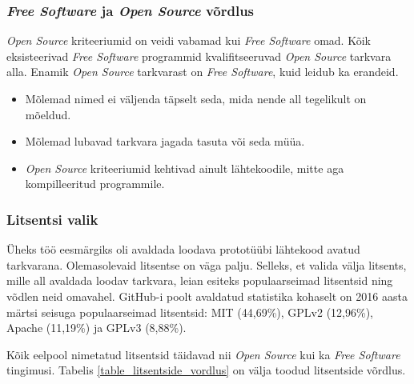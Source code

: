 \documentclass[a4paper,12pt]{article} %
\begin{document}
\subsubsection{\textit{Free Software} ja \textit{Open Source} võrdlus}
\textit{Open Source} kriteeriumid on veidi vabamad kui \textit{Free Software} omad. Kõik eksisteerivad \textit{Free Software} programmid kvalifitseeruvad \textit{Open Source} tarkvara alla. Enamik \textit{Open Source} tarkvarast on \textit{Free Software}, kuid leidub ka erandeid.
\cite{OS_VS_FS}
\begin{itemize}
\item Mõlemad nimed ei väljenda täpselt seda, mida nende all tegelikult on mõeldud.
\item Mõlemad lubavad tarkvara jagada tasuta või seda müüa.
\item \textit{Open Source} kriteeriumid kehtivad ainult lähtekoodile, mitte aga kompilleeritud programmile.
\end{itemize}
\subsubsection{Litsentsi valik}
Üheks töö eesmärgiks oli avaldada loodava prototüübi lähtekood avatud tarkvarana. Olemasolevaid litsentse on väga palju. Selleks, et valida välja litsents, mille all avaldada loodav tarkvara, leian esiteks populaarseimad litsentsid ning võdlen neid omavahel.
GitHub-i poolt avaldatud statistika kohaselt on 2016 aasta märtsi seisuga populaarseimad litsentsid: MIT (44,69\%), GPLv2 (12,96\%), Apache (11,19\%) ja GPLv3 (8,88\%). \cite{GitHub_Opensource_Licence_Usage}\par
Kõik eelpool nimetatud litsentsid täidavad nii \textit{Open Source} kui ka \textit{Free Software} tingimusi. Tabelis \ref{table_litsentside_vordlus} on välja toodud litsentside võrdlus.
\end{document}
